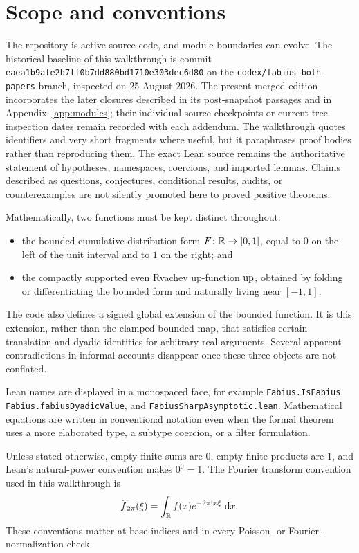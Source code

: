 \documentclass[11pt,oneside]{article}
\theoremstyle{definition}
\theoremstyle{remark}
\begin{document}
\section*{Scope and conventions}
The repository is active source code, and module boundaries can evolve.  The
historical baseline of this walkthrough is commit
\nolinkurl{eaea1b9afe2b7ff0b7dd880bd1710e303dec6d80} on the
\texttt{codex/fabius-both-papers} branch, inspected on 25 August 2026.  The
present merged edition incorporates the later closures described in its
post-snapshot passages and in Appendix~\ref{app:modules}; their individual
source checkpoints or current-tree inspection dates remain recorded with each
addendum.  The walkthrough quotes identifiers and very short fragments where
useful, but it paraphrases proof bodies rather than reproducing them.  The exact
Lean source remains the authoritative statement of hypotheses, namespaces,
coercions, and imported lemmas.  Claims described as questions, conjectures,
conditional results, audits, or counterexamples are not silently promoted here
to proved positive theorems.

Mathematically, two functions must be kept distinct throughout:
\begin{itemize}
  \item the bounded cumulative-distribution form \(F\colon\mathbb{R}\to[0,1]\), equal to \(0\) on the left of the unit interval and to \(1\) on the right; and
  \item the compactly supported even Rvachev up-function \(\operatorname{up}\), obtained by folding or differentiating the bounded form and naturally living near \([-1,1]\).
\end{itemize}
The code also defines a signed global extension of the bounded function.  It is this extension, rather than the clamped bounded map, that satisfies certain translation and dyadic identities for arbitrary real arguments.  Several apparent contradictions in informal accounts disappear once these three objects are not conflated.

Lean names are displayed in a monospaced face, for example \nolinkurl{Fabius.IsFabius}, \nolinkurl{Fabius.fabiusDyadicValue}, and \nolinkurl{FabiusSharpAsymptotic.lean}.  Mathematical equations are written in conventional notation even when the formal theorem uses a more elaborated type, a subtype coercion, or a filter formulation.

Unless stated otherwise, empty finite sums are \(0\), empty finite products
are \(1\), and Lean's natural-power convention makes \(0^0=1\).  The Fourier
transform convention used in this walkthrough is
\[
  \widehat{f}_{\,2\pi}(\xi)=\int_{\mathbb{R}}f(x)e^{-2\pi\mathrm{i} x\xi}\,\mathop{}\!\mathrm{d} x.
\]
These conventions matter at base indices and in every Poisson- or
Fourier-normalization check.
\end{document}
